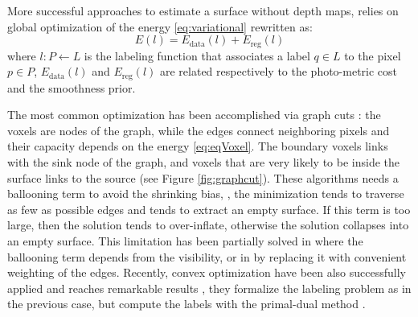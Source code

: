 More successful approaches to estimate a surface without depth maps, relies on global optimization of the energy \eqref{eq:variational} rewritten as:
\begin{equation}
\label{eq:eqVoxel}
E(\mathit{l}) = E_{\text{data}}(\mathit{l}) + E_{\text{reg}} (\mathit{l})  
\end{equation}
where $\mathit{l}:\mathit{P}\leftarrow \mathit{L}$ is the labeling function that associates a label $q\in \mathit{L}$ to the pixel $p \in\mathit{P}$, $E_{\text{data}}(\mathit{l})$ and $E_{\text{reg}} (\mathit{l})$ are related respectively to the photo-metric cost and the smoothness prior.

The most common optimization has been accomplished via graph cuts \cite{vogiatzis2005multi,kolmogorov2002multi,hornung2006hierarchical,furukawa2006carved,mucke2011surface,hernandez2007probabilistic}: the voxels are nodes of the graph, while the edges connect neighboring pixels and their capacity depends on the energy \eqref{eq:eqVoxel}. The boundary voxels links with the sink node of the graph, and voxels that are very likely to be inside the surface links to the source (see Figure \ref{fig:graphcut}).
These algorithms needs a ballooning term to avoid the shrinking bias, \ie, the minimization tends to traverse as few as possible edges and tends to extract an empty surface. If this term is too large, then the solution tends to over-inflate, otherwise the solution collapses into an empty surface.
This limitation has been partially solved in \cite{hernandez2007probabilistic} where the ballooning term depends  from the visibility, or in \cite{mucke2011surface} by replacing it with convenient weighting of the edges. 
Recently, convex optimization have been also successfully applied and reaches remarkable results
\cite{kolev2009continuous,kolev2010anisotropic,kostrikov2014probabilistic,savinov2016semantic}, they formalize the labeling problem as in the previous case, but compute the labels with the primal-dual method \cite{mehrotra1992implementation}.




